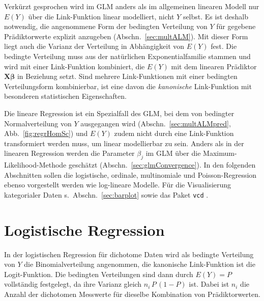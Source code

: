 Verkürzt gesprochen wird im GLM anders als im allgemeinen linearen Modell nur $E(Y)$ über die Link-Funktion linear modelliert, nicht $Y$ selbst. Es ist deshalb notwendig, die angenommene Form der bedingten Verteilung von $Y$ für gegebene Prädiktorwerte explizit anzugeben (Abschn.\ \ref{sec:multALM}). Mit dieser Form liegt auch die Varianz der Verteilung in Abhängigkeit von $E(Y)$ fest. Die bedingte Verteilung muss aus der natürlichen Exponentialfamilie stammen und wird mit einer Link-Funktion kombiniert, die $E(Y)$ mit dem linearen Prädiktor $\bm{X} \bm{\beta}$ in Beziehung setzt. Sind mehrere Link-Funktionen mit einer bedingten Verteilungsform kombinierbar, ist eine davon die \emph{kanonische} Link-Funktion mit besonderen statistischen Eigenschaften.

Die lineare Regression ist ein Spezialfall des GLM, bei dem von bedingter Normalverteilung von $Y$ ausgegangen wird (Abschn.\ \ref{sec:multALMpred}, Abb.\ \ref{fig:regrHomSc}) und $E(Y)$ zudem nicht durch eine Link-Funktion transformiert werden muss, um linear modellierbar zu sein. Anders als in der linearen Regression werden die Parameter $\beta_{j}$ im GLM über die Maximum-Likelihood-Methode geschätzt (Abschn.\ \ref{sec:glmConvergence}). In den folgenden Abschnitten sollen die logistische, ordinale, multinomiale und Poisson-Regression ebenso vorgestellt werden wie log-lineare Modelle. Für die Visualisierung kategorialer Daten s.\ Abschn.\ \ref{sec:barplot} sowie das Paket \lstinline!vcd! \cite{Meyer2009b}.

\section{Logistische Regression}
\label{sec:regrLog}

In der logistischen Regression für dichotome Daten wird als bedingte Verteilung von $Y$ die Binomialverteilung angenommen, die kanonische Link-Funktion ist die Logit-Funktion. Die bedingten Verteilungen sind dann durch $E(Y) = P$ vollständig festgelegt, da ihre Varianz gleich $n_{i} \, P \, (1-P)$ ist. Dabei ist $n_{i}$ die Anzahl der dichotomen Messwerte für dieselbe Kombination von Prädiktorwerten.

